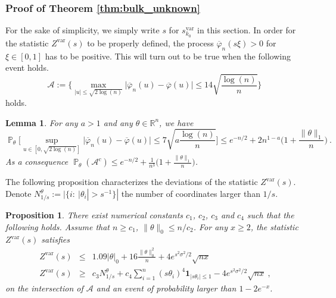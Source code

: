 \documentclass[twoside,11pt]{article}
\newtheorem{prp}{Proposition}
\newtheorem{lem}{Lemma}
\def\beq{\begin{equation}}
\def\eeq{\end{equation}}
\def\beqn{\begin{eqnarray*}}
\def\eeqn{\end{eqnarray*}}
\def\cA{\mathcal{A}}
\renewcommand{\P}{\operatorname{\mathbb{P}}}
\newcommand{\<}{\langle}
\renewcommand{\>}{\rangle}
\begin{document}
\subsubsection{Proof of Theorem \ref{thm:bulk_unknown}}
For the sake of simplicity, we simply write $s$ for $s_{k_0}^{\mathrm{var}}$ in this section. In order for the statistic $Z^{\mathrm{var}}(s)$ to be properly defined, the process  $\overline{\varphi}_n(s\xi)>0$ for $\xi\in [0,1]$ has to be positive. This will turn out to be true when the following  event holds.
\beq\label{eq:definition_A}
\cA:= \Big\{\max_{|u| \leq \sqrt{2\log(n)}} \big|\overline{\varphi}_n(u)-\overline{\varphi}(u)\big| \leq 14 \sqrt{\frac{\log(n)}{n}} \Big\}\ 
\eeq
holds.

\begin{lem}\label{lem:unform_control_characteristic_function}
For any $a>1$ and any $\theta\in\mathbb{R}^n$, we have
\beq\label{eq:control_uniform_characteristic}
 \P_{\theta}\Big[\sup_{u \in [0,\sqrt{2\log(n)}]}\big|\overline{\varphi}_n(u) - \overline{\varphi}(u)\big|\leq 7 \sqrt{a\frac{\log(n)}{n} }\Big]\leq e^{-n/2}+  2n^{1-a}\big(1 + \frac{\|\theta\|_1}{n}\big)\ .
\eeq
As a consequence $\P_{\theta}(\cA^c)\leq e^{-n/2}+  \frac{1}{n^{3}}\big(1 + \frac{\|\theta\|_1}{n}\big)$.
\end{lem}



The following proposition  characterizes the  deviations of the statistic $Z^{\mathrm{var}}(s)$. Denote $N_{1/s}^{\theta}:=  |\{i:\ |\theta_i|> s^{-1}\}|$ the number of coordinates larger than $1/s$.
\begin{prp}\label{prp:power_Z_unknown variance}
There exist numerical constants $c_1$, $c_2$, $c_3$ and $c_4$ such that the following holds. Assume that $n\geq c_1$, $\|\theta\|_0\leq n/c_2$. 
For any $x\geq 2$, the statistic $Z^{\mathrm{var}}(s)$ satisfies 
 \beqn
Z^{\mathrm{var}}(s) &\leq&  1.09|\theta|_{0}+   16 \frac{\|\theta\|_0^2}{n} + 4e^{s^2\sigma^2/2}\sqrt{nx} \\
Z^{\mathrm{var}}(s)&\geq &  c_3 N_{1/s}^{\theta} +  c_4 \sum_{i=1}^n (s\theta_i)^4 \mathbf{1}_{| s \theta_i|\leq 1}    - 4 e^{s^2\sigma^2/2}\sqrt{nx}  \ ,
\eeqn 
on the intersection of $\cA$ and an event of probability larger than $1-2e^{-x}$.
\end{prp}
\end{document}
